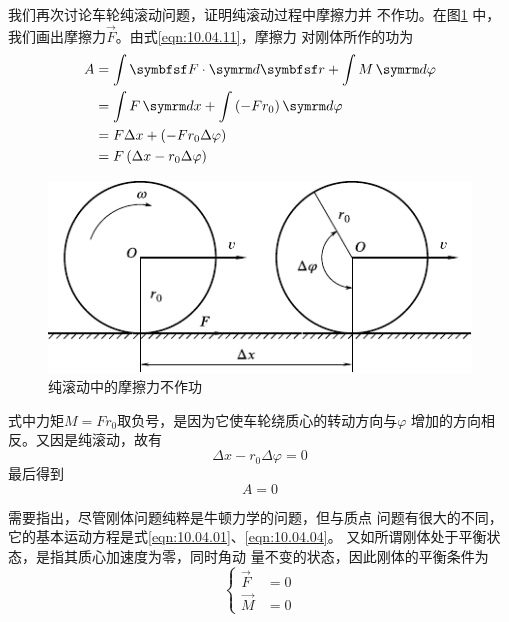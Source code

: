 我们再次讨论车轮纯滚动问题，证明纯滚动过程中摩擦力并
不作功。在图\ref{fig:10.13} 中，我们画出摩擦力$\vec{F}$。由式\eqref{eqn:10.04.11}，摩擦力
对刚体所作的功为
\begin{equation*}
  \begin{split}
    A &= \int \vec{ F } \cdot \dif \vec{r} + \int M \dif \varphi \\
    &= \int F \dif x + \int \left( - F r _ { 0 } \right) \dif \varphi \\
    &= F \Delta x + \left( - F r _ { 0 } \Delta \varphi \right) \\%
    &= F \left( \Delta x - r _ { 0 } \Delta \varphi \right)
  \end{split}
\end{equation*}

\clearpage
\begin{figure}[h]
  \centering
  \includegraphics{figure/fig10.13}
  \caption{纯滚动中的摩擦力不作功}
  \label{fig:10.13}
\end{figure}
式中力矩$ M = F r _ { 0 } $取负号，是因为它使车轮绕质心的转动方向与$ \varphi $
增加的方向相反。又因是纯滚动，故有
\begin{equation*}
  \Delta x - r _ { 0 } \Delta \varphi = 0
\end{equation*}
最后得到
\begin{equation*}
  A = 0
\end{equation*}

需要指出，尽管刚体问题纯粹是牛顿力学的问题，但与质点
问题有很大的不同，它的基本运动方程是式\eqref{eqn:10.04.01}、\eqref{eqn:10.04.04}。
又如所谓刚体处于平衡状态，是指其质心加速度为零，同时角动
量不变的状态，因此刚体的平衡条件为
\begin{equation}\label{eqn:10.04.12}
  \begin{cases}
    \vec{ F } & = 0 \\
    \vec{ M } & = 0
  \end{cases}
\end{equation}

